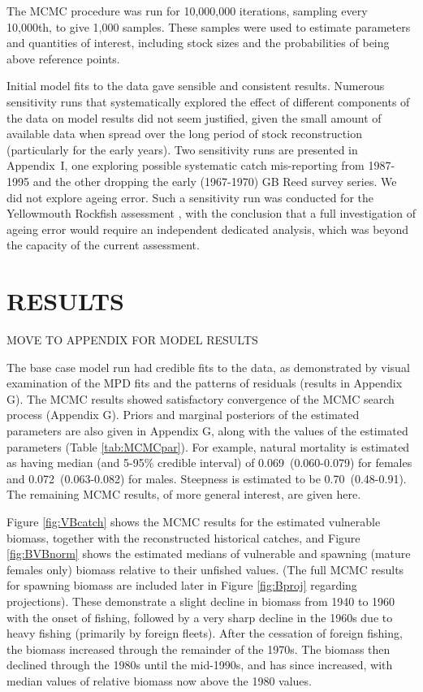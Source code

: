 The MCMC procedure was run for 10,000,000 iterations, sampling every 10,000th, to give 1,000 samples. These samples were used to estimate parameters and quantities of interest, including stock sizes and the probabilities of being above reference points.

Initial model fits to the data gave sensible and consistent results. Numerous sensitivity runs that systematically explored the effect of different components of the data on model results did not seem justified, given the small amount of available data when spread over the long period of stock reconstruction (particularly for the early years). Two sensitivity runs are presented in Appendix~I, one exploring possible systematic catch mis-reporting from 1987-1995 and the other dropping the early (1967-1970) GB Reed survey series. We did not explore ageing error. Such a sensitivity run was conducted for the Yellowmouth Rockfish assessment , with the conclusion that a full investigation of ageing error would require an independent dedicated analysis, which was beyond the capacity of the current assessment.



\section{RESULTS}

MOVE TO APPENDIX FOR MODEL RESULTS

The base case model run had credible fits to the data, as demonstrated by visual examination of the MPD fits and the patterns of residuals (results in Appendix G). The MCMC results showed satisfactory convergence of the MCMC search process (Appendix G). Priors and marginal posteriors of the estimated parameters are also given in Appendix G, along with the values of the estimated parameters (Table \ref{tab:MCMCpar}). For example, natural mortality is estimated as having median (and 5-95\% credible interval) of 0.069~(0.060-0.079) for females and 0.072~(0.063-0.082) for males. Steepness is estimated to be 0.70~(0.48-0.91). The remaining MCMC results, of more general interest, are given here.

Figure \ref{fig:VBcatch} shows the MCMC results for the estimated vulnerable biomass, together with the reconstructed historical catches, and Figure \ref{fig:BVBnorm} shows the estimated medians of vulnerable and spawning (mature females only) biomass relative to their unfished values. (The full MCMC results for spawning biomass are included later in Figure \ref{fig:Bproj} regarding projections). These demonstrate a slight decline in biomass from 1940 to 1960 with the onset of fishing, followed by a very sharp decline in the 1960s due to heavy fishing (primarily by foreign fleets). After the cessation of foreign fishing, the biomass increased through the remainder of the 1970s. The biomass then declined through the 1980s until the mid-1990s, and has since increased, with median values of relative biomass now above the 1980 values.

